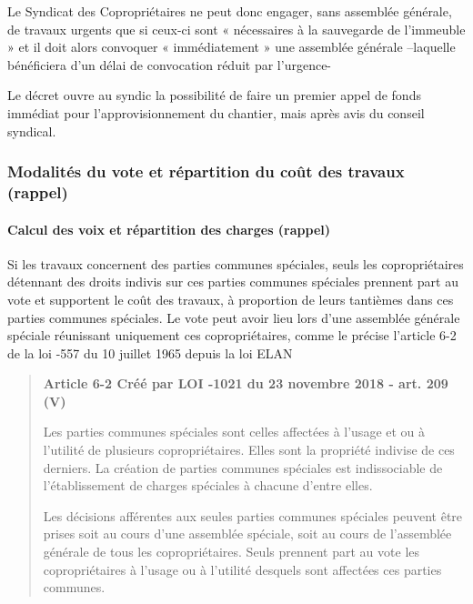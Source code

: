 			Le Syndicat des Copropriétaires ne peut donc engager, sans assemblée générale, de travaux urgents que si ceux-ci sont « nécessaires à la sauvegarde de l’immeuble » et il doit alors convoquer « immédiatement » une assemblée générale –laquelle bénéficiera d’un délai de convocation réduit par l’urgence-
			
			Le décret ouvre au syndic la possibilité de faire un premier appel de fonds immédiat pour l’approvisionnement du chantier, mais après avis du conseil syndical.
		
		\subsubsection{Modalités du vote et répartition du coût des travaux (rappel)}
		
			\paragraph{Calcul des voix et répartition des charges (rappel)}
			
				Si les travaux concernent des parties communes spéciales, seuls les copropriétaires détennant des droits indivis sur ces parties communes spéciales prennent part au vote et supportent le coût des travaux, à proportion de leurs tantièmes dans ces parties communes spéciales. Le vote peut avoir lieu lors d’une assemblée générale spéciale réunissant uniquement ces copropriétaires, comme le précise l’article 6-2 de la loi -557 du 10 juillet 1965 depuis la loi ELAN
				
				\begin{quote}
					{\bfseries Article 6-2 Créé par LOI -1021 du 23 novembre 2018 - art. 209 (V)}
					
					Les parties communes spéciales sont celles affectées à l'usage et ou à l'utilité de plusieurs copropriétaires. Elles sont la propriété indivise de ces derniers.
					La création de parties communes spéciales est indissociable de l'établissement de charges spéciales à chacune d'entre elles.
					
					Les décisions afférentes aux seules parties communes spéciales peuvent être prises soit au cours d'une assemblée spéciale, soit au cours de l'assemblée générale de tous les copropriétaires. Seuls prennent part au vote les copropriétaires à l'usage ou à l'utilité desquels sont affectées ces parties communes.
				\end{quote}
				
